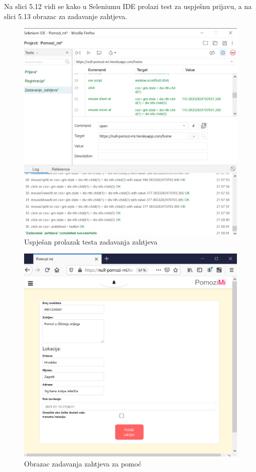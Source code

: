         \noindent \text 
        Na slici 5.12 vidi se kako u Seleniumu IDE prolazi test za uspješnu prijavu, a na slici 5.13 obrazac za zadavanje zahtjeva. \\
		\begin{figure}[H]
                 \includegraphics[width=\textwidth, height=\textheight, keepaspectratio]{slike/zadavanjeUspjesno.png}
                \centering
                \caption{Uspješan prolazak testa zadavanja zahtjeva}
        \end{figure}
		\begin{figure}[H]
                 \includegraphics[width=\textwidth, height=\textheight, keepaspectratio]{slike/zadavanjeZahtjeva.png}
                \centering
                \caption{Obrazac zadavanja zahtjeva za pomoć}
        \end{figure}
